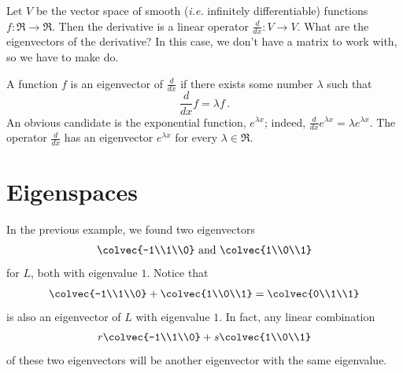 \begin{example}
Let $V$ be the vector space of smooth (\textit{i.e.} infinitely differentiable) functions $f \colon \Re\rightarrow \Re$.  Then the derivative is a linear operator $\frac{d}{dx} \colon V\rightarrow V$.  What are the eigenvectors of the derivative?  In this case, we don't have a matrix to work with, so we have to make do.

A function $f$ is an eigenvector of $\frac{d}{dx}$ if there exists some number $\lambda$ such that \[\frac{d}{dx}f=\lambda f\, .\]  An obvious candidate is the exponential function, $e^{\lambda x}$; indeed, $\frac{d}{dx} e^{\lambda x} = \lambda e^{\lambda x}$.
The operator $\frac{d}{dx}$ has an eigenvector $e^{\lambda x}$ for every $\lambda \in \Re$.
\end{example}


\section{Eigenspaces}
In the previous example, we found two eigenvectors  \[\colvec{-1\\1\\0} \mbox{ and }\colvec{1\\0\\1}\] for $L$, both with eigenvalue $1$.  Notice that  \[\colvec{-1\\1\\0} + \colvec{1\\0\\1}=
\colvec{0\\1\\1}\] is also an eigenvector of $L$ with eigenvalue $1$.  In fact, any linear combination \[r\colvec{-1\\1\\0} + s\colvec{1\\0\\1}\] of these two eigenvectors will be another eigenvector with the same eigenvalue.  


